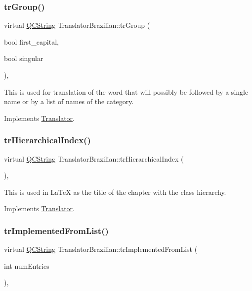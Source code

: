 \subsubsection{\texorpdfstring{trGroup()}{trGroup()}}
{\footnotesize\ttfamily virtual \mbox{\hyperlink{class_q_c_string}{Q\+C\+String}} Translator\+Brazilian\+::tr\+Group (\begin{DoxyParamCaption}\item[{bool}]{first\+\_\+capital,  }\item[{bool}]{singular }\end{DoxyParamCaption})\hspace{0.3cm}{\ttfamily [inline]}, {\ttfamily [virtual]}}

This is used for translation of the word that will possibly be followed by a single name or by a list of names of the category. 

Implements \mbox{\hyperlink{class_translator}{Translator}}.

\mbox{\label{class_translator_brazilian_a3acc286ec6706da06f60404c0cb84b5a}} 
\subsubsection{\texorpdfstring{trHierarchicalIndex()}{trHierarchicalIndex()}}
{\footnotesize\ttfamily virtual \mbox{\hyperlink{class_q_c_string}{Q\+C\+String}} Translator\+Brazilian\+::tr\+Hierarchical\+Index (\begin{DoxyParamCaption}{ }\end{DoxyParamCaption})\hspace{0.3cm}{\ttfamily [inline]}, {\ttfamily [virtual]}}

This is used in La\+TeX as the title of the chapter with the class hierarchy. 

Implements \mbox{\hyperlink{class_translator}{Translator}}.

\mbox{\label{class_translator_brazilian_a539b02ebbaab3365cf7392ada7305598}} 
\subsubsection{\texorpdfstring{trImplementedFromList()}{trImplementedFromList()}}
{\footnotesize\ttfamily virtual \mbox{\hyperlink{class_q_c_string}{Q\+C\+String}} Translator\+Brazilian\+::tr\+Implemented\+From\+List (\begin{DoxyParamCaption}\item[{int}]{num\+Entries }\end{DoxyParamCaption})\hspace{0.3cm}{\ttfamily [inline]}, {\ttfamily [virtual]}}


